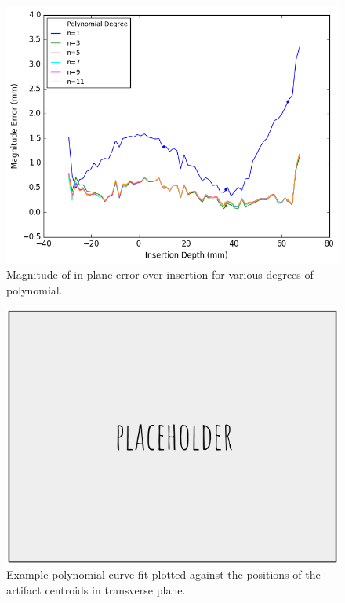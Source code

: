 \begin{figure}[h]
\includegraphics[width=1.0\textwidth]{Fig/chap5/errors_polynomials_3_samples.png}
\caption{Magnitude of in-plane error over insertion for various degrees of polynomial.}
\label{fig:results_error_comparison}
\end{figure}

\begin{figure}[h]
\includegraphics[width=1.0\textwidth]{Fig/placeholder.png}
\caption{Example polynomial curve fit plotted against the positions of the artifact centroids in transverse plane.}
\label{fig:curve_fit_artifact}
\end{figure}

